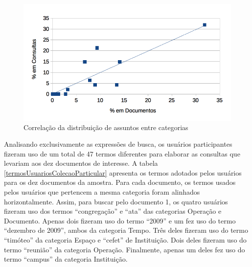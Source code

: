 \begin{figure}
	\caption{\label{fig:avaliacaoPart-correlacaoDistribuicaoAssuntos}Correlação da distribuição de assuntos entre categorias}

	\centering
		\includegraphics[width=1.0\textwidth]{fig/avaliacaoPart-correlacaoDistribuicaoAssuntos.png}

\end{figure}

Analisando exclusivamente as expressões de busca, os usuários participantes fizeram uso de um total de 47 termos diferentes para elaborar as consultas que levariam aos dez documentos de interesse. A tabela \ref{termosUsuariosColecaoParticular} apresenta os termos adotados pelos usuários para os dez documentos da amostra. Para cada documento, os termos usados pelos usuários que pertencem a mesma categoria foram alinhados horizontalmente. Assim, para buscar pelo documento 1, os quatro usuários fizeram uso dos termos “congregação” e “ata” das categorias Operação e Documento. Apenas dois fizeram uso do termo “2009” e um fez uso do termo “dezembro de 2009”, ambos da categoria Tempo. Três deles fizeram uso do termo “timóteo” da categoria Espaço e “cefet” de Instituição. Dois deles fizeram uso do termo “reunião” da categoria Operação. Finalmente, apenas um deles fez uso do termo “campus” da categoria Instituição.





